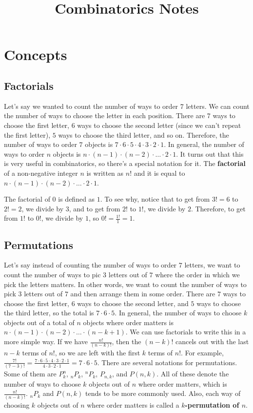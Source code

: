 \documentclass[twocolumn]{article}
\title{Combinatorics Notes}
\author{}
\date{}
\begin{document}
\maketitle

\section*{Concepts}

\subsection*{Factorials}
Let's say we wanted to count the number of ways to order $7$ letters. We can 
count the number of ways to choose the letter in each position. There are $7$ 
ways to choose the first letter, $6$ ways to choose the second letter (since we 
can't repeat the first letter), $5$ ways to choose the third letter, and so on. 
Therefore, the number of ways to order $7$ objects is $7 \cdot 6 \cdot 5 \cdot 4 
\cdot 3 \cdot 2 \cdot 1$. In general, the number of ways to order $n$ objects is 
$n \cdot (n - 1) \cdot (n - 2) \cdot \dots \cdot 2 \cdot 1$. It turns out that 
this is very useful in combinatorics, so there's a special notation for it. The 
\textbf{factorial} of a non-negative integer $n$ is written as $n!$ and it is 
equal to $n \cdot (n - 1) \cdot (n - 2) \cdot \dots \cdot 2 \cdot 1$.

The factorial of $0$ is defined as $1$. To see why, notice that to get from $3!  
= 6$ to $2! = 2$, we divide by $3$, and to get from $2!$ to $1!$, we divide by 
$2$. Therefore, to get from $1!$ to $0!$, we divide by $1$, so $0! = 
\frac{1!}{1} = 1$.

\subsection*{Permutations}
Let's say instead of counting the number of ways to order $7$ letters, we want 
to count the number of ways to pic $3$ letters out of $7$ where the order in 
which we pick the letters matters. In other words, we want to count the number 
of ways to pick $3$ letters out of $7$ and then arrange them in some order. 
There are $7$ ways to choose the first letter, $6$ ways to choose the second 
letter, and $5$ ways to choose the third letter, so the total is $7 \cdot 6 
\cdot 5$. In general, the number of ways to choose $k$ objects out of a total of 
$n$ objects where order matters is $n \cdot (n - 1) \cdot (n - 2) \cdot \dots 
\cdot (n - k + 1)$. We can use factorials to write this in a more simple way. If 
we have $\frac{n!}{(n - k)!}$, then the $(n - k)!$ cancels out with the last $n 
- k$ terms of $n!$, so we are left with the first $k$ terms of $n!$. For 
example, $\frac{7!}{(7 - 3)!} = \frac{7 \cdot 6 \cdot 5 \cdot 4 \cdot 3 \cdot 2 
\cdot 1}{4 \cdot 3 \cdot 2 \cdot 1} = 7 \cdot 6 \cdot 5$. There are several 
notations for permutations. Some of them are $P^n_k$, $_nP_k$, $^nP_k$, $P_{n, 
k}$, and $P(n, k)$. All of these denote the number of ways to choose $k$ objects 
out of $n$ where order matters, which is $\frac{n!}{(n - k)!}$. $_nP_k$ and 
$P(n, k)$ tends to be more commonly used. Also, each way of choosing $k$ objects 
out of $n$ where order matters is called a \textbf{$k$-permutation of $n$}.
\end{document}
